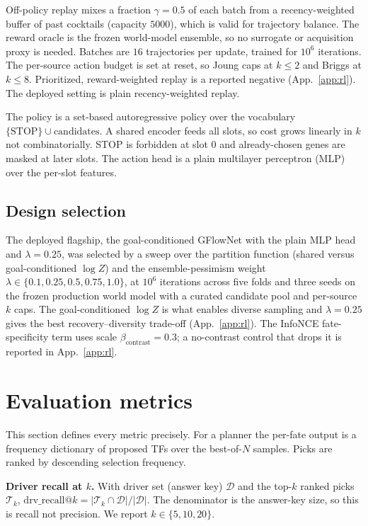 Off-policy replay mixes a fraction $\gamma{=}0.5$ of each batch from a recency-weighted buffer
of past cocktails (capacity $5000$), which is valid for trajectory balance. The reward oracle
is the frozen world-model ensemble, so no surrogate or acquisition proxy is needed. Batches
are $16$ trajectories per update, trained for $10^{6}$ iterations. The per-source action
budget is set at reset, so Joung caps at $k{\le}2$ and Briggs at $k{\le}8$. Prioritized,
reward-weighted replay is a reported negative (App.~\ref{app:rl}). The deployed setting is
plain recency-weighted replay.

The policy is a set-based autoregressive policy over the vocabulary
$\{\text{STOP}\}\cup\text{candidates}$. A shared encoder feeds all slots, so cost grows
linearly in $k$ not combinatorially. STOP is forbidden at slot $0$ and already-chosen genes
are masked at later slots. The action head is a plain multilayer perceptron (MLP)
over the per-slot features.

\subsection{Design selection}
The deployed flagship, the goal-conditioned GFlowNet with the plain MLP head and
$\lambda{=}0.25$, was selected by a sweep over the partition function (shared versus
goal-conditioned $\log Z$) and the ensemble-pessimism weight
$\lambda\in\{0.1,0.25,0.5,0.75,1.0\}$, at $10^6$ iterations across five folds and three seeds
on the frozen production world model with a curated candidate pool and per-source $k$ caps.
The goal-conditioned $\log Z$ is what enables diverse sampling and $\lambda{=}0.25$ gives the
best recovery--diversity trade-off (App.~\ref{app:rl}). The InfoNCE fate-specificity term uses
scale $\beta_{\mathrm{contrast}}{=}0.3$; a no-contrast control that drops it is reported in
App.~\ref{app:rl}.

\section{Evaluation metrics}\label{app:metrics}
This section defines every metric precisely. For a planner the per-fate output is a
frequency dictionary of proposed TFs over the best-of-$N$ samples. Picks are ranked by
descending selection frequency.

\textbf{Driver recall at $k$.} With driver set (answer key) $\mathcal{D}$ and the top-$k$
ranked picks $\mathcal{T}_k$, $\mathrm{drv\_recall}@k = \lvert\mathcal{T}_k\cap\mathcal{D}\rvert/\lvert\mathcal{D}\rvert$.
The denominator is the answer-key size, so this is recall not precision. We report
$k\in\{5,10,20\}$.

